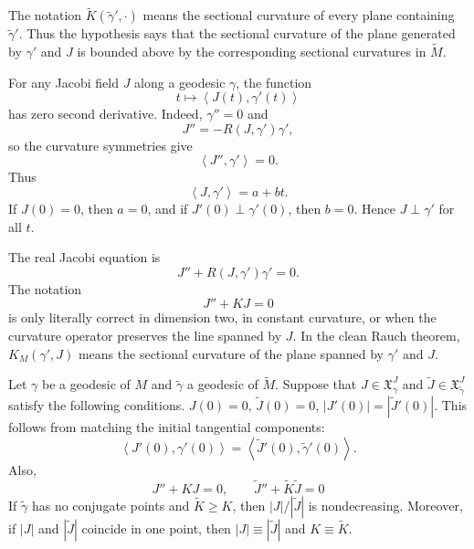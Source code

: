\begin{remark}
\label{remark-rauch-comparison-notation}
The notation $\tilde K(\tilde\gamma',\cdot)$
means the sectional curvature of every plane
containing $\tilde\gamma'$. Thus the
hypothesis says that the sectional curvature
of the plane generated by $\gamma'$ and $J$
is bounded above by the corresponding
sectional curvatures in $\tilde M$.
\end{remark}

\begin{remark}
\label{remark-jacobi-orthogonality-initial}
For any Jacobi field $J$ along a geodesic
$\gamma$, the function
$$
t\mapsto \left\langle{}J(t),\gamma'(t)
\right\rangle{}
$$
has zero second derivative. Indeed,
$\gamma''=0$ and
$$
J''=-R(J,\gamma')\gamma',
$$
so the curvature symmetries give
$$
\left\langle{}J'',\gamma'\right\rangle{}=0.
$$
Thus
$$
\left\langle{}J,\gamma'\right\rangle{}=a+bt.
$$
If $J(0)=0$, then $a=0$, and if
$J'(0)\perp\gamma'(0)$, then $b=0$. Hence
$J\perp\gamma'$ for all $t$.
\end{remark}

\begin{remark}
\label{remark-rauch-real-jacobi-equation}
The real Jacobi equation is
$$
J''+R(J,\gamma')\gamma'=0.
$$
The notation
$$
J''+KJ=0
$$
is only literally correct in dimension two,
in constant curvature, or when the curvature
operator preserves the line spanned by $J$.
In the clean Rauch theorem, $K_M(\gamma',J)$
means the sectional curvature of the plane
spanned by $\gamma'$ and $J$.
\end{remark}

\begin{theorem}
\label{theorem-rauch}
Let $\gamma$ be a geodesic of $M$ and
$\tilde{\gamma}$ a geodesic of
$\tilde{M}$. Suppose that $J \in
\mathfrak{X}^J_\gamma$ and $\tilde{J}\in
\mathfrak{X}^J_{\tilde{\gamma}}$ satisfy the
following conditions. $J(0)=0$,
$\tilde{J}(0)=0$, $|J'(0)|=|\tilde{J}'(0)|$.
This follows from matching the initial
tangential components:
$$
\left\langle{}J'(0),\gamma'(0)\right\rangle{}
=
\left\langle{}\tilde{J}'(0),
\tilde{\gamma}'(0)\right\rangle{}.
$$
Also,
$$
J''+K J=0,\qquad
\tilde{J}''+\tilde{K}\tilde{J}=0
$$
If $\tilde{\gamma}$ has no conjugate points
and $\tilde{K}\geq K$, then
$|J|/|\tilde{J}|$ is nondecreasing. Moreover,
if $|J|$ and $|\tilde{J}|$
coincide in one point, then $|J|\equiv
|\tilde{J}|$ and $K \equiv \tilde{K}$.
\end{theorem}

